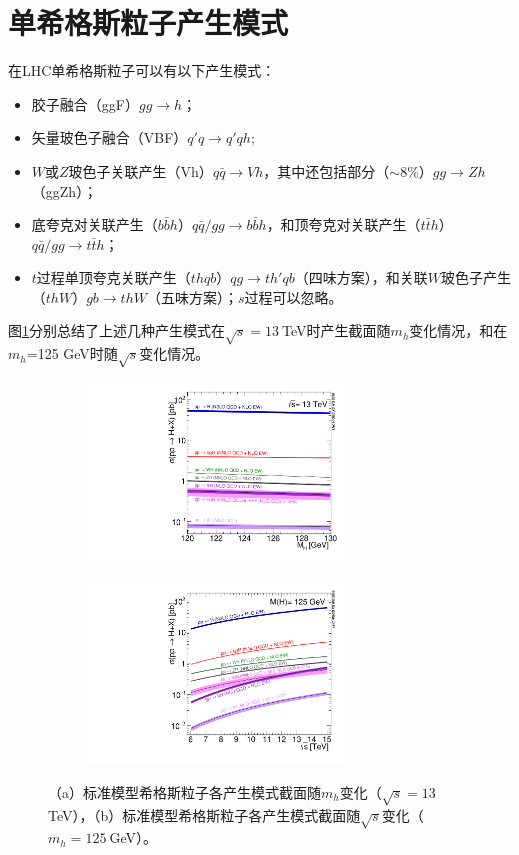 \section{单希格斯粒子产生模式}
在LHC单希格斯粒子可以有以下产生模式：
\begin{itemize}
 \item 胶子融合（ggF）$gg\rightarrow h$；
 \item 矢量玻色子融合（VBF）$q\prime{q}\rightarrow q\prime{q}h$;
 \item $W$或$Z$玻色子关联产生（Vh）$q\bar{q}\rightarrow Vh$，其中还包括部分（$\sim$8\%）$gg\rightarrow Zh$（ggZh）；
 \item 底夸克对关联产生（$b\bar{b}h$）$q\bar{q}/gg\rightarrow b\bar{b}h$，和顶夸克对关联产生（$t\bar{t}h$）$q\bar{q}/gg\rightarrow t\bar{t}h$；
 \item $t$过程单顶夸克关联产生（$thqb$）$qg\rightarrow th\prime{q}b$（四味方案），和关联$W$玻色子产生（$thW$）$gb\rightarrow thW$（五味方案）；$s$过程可以忽略。
\end{itemize}
图\ref{fig:LHCHIGGSWG}分别总结了上述几种产生模式在$\sqrt{s}=13~$TeV时产生截面随$m_h$变化情况，和在$m_h$=125 GeV时随$\sqrt{s}$变化情况。
\begin{figure}[h]
\centering
 \begin{subfigure}[b]{0.45\textwidth}
  \includegraphics[width=0.75\textwidth,angle=-90]{fig/plot_13tev_H_sqrt.pdf}
  \caption{}
 \end{subfigure}
 \begin{subfigure}[b]{0.45\textwidth}
  \includegraphics[width=0.75\textwidth,angle=-90]{fig/Plot_Escan_H125_new_sqrt.pdf}
  \caption{}
 \end{subfigure}
\caption{（a）标准模型希格斯粒子各产生模式截面随$m_h$变化（$\sqrt{s}=13~$TeV），（b）标准模型希格斯粒子各产生模式截面随$\sqrt{s}$变化（$m_h=125~$GeV）。}
\label{fig:LHCHIGGSWG}
\end{figure}
